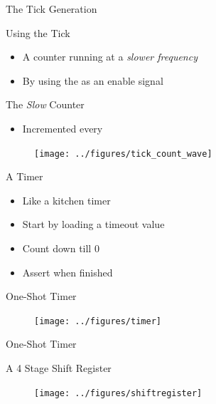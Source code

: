 \begin{frame}[fragile]{The Tick Generation}
\end{frame}

\begin{frame}[fragile]{Using the Tick}
\begin{itemize}
\item A counter running at a \emph{slower frequency}
\item By using the  as an enable signal
\end{itemize}
\end{frame}

\begin{frame}[fragile]{The \emph{Slow} Counter}
\begin{itemize}
\item Incremented every 
\end{itemize}
\begin{figure}
  \texttt{[image: ../figures/tick\_count\_wave]}
\end{figure}
\end{frame}

\begin{frame}[fragile]{A Timer}
\begin{itemize}
\item Like a kitchen timer
\item Start by loading a timeout value
\item Count down till 0
\item Assert  when finished
\end{itemize}
\end{frame}

\begin{frame}[fragile]{One-Shot Timer}
\begin{figure}
  \texttt{[image: ../figures/timer]}
\end{figure}
\end{frame}

\begin{frame}[fragile]{One-Shot Timer}
\end{frame}

\begin{frame}[fragile]{A 4 Stage Shift Register}
\begin{figure}
  \texttt{[image: ../figures/shiftregister]}
\end{figure}
\end{frame}



